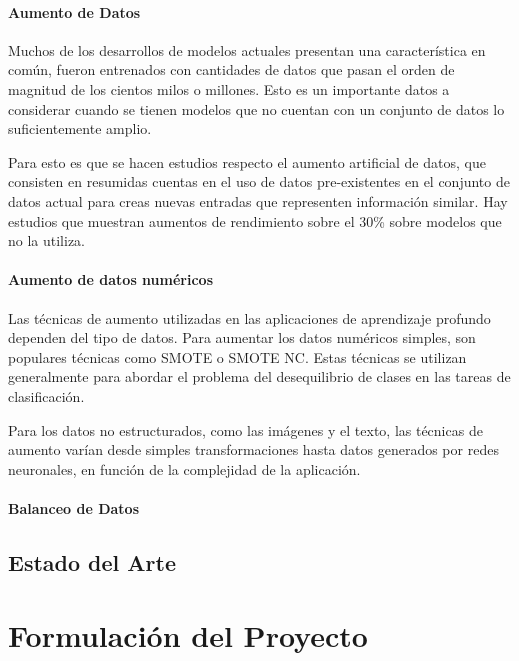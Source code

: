 \documentclass[letter,12pt]{report}
\begin{document}
\subsubsection{Aumento de Datos}
Muchos de los desarrollos de modelos actuales presentan una característica en común,
fueron entrenados con cantidades de datos que pasan el orden de magnitud de los cientos
milos o millones. Esto es un importante datos a considerar cuando se tienen modelos que
no cuentan con un conjunto de datos lo suficientemente amplio.

Para esto es que se hacen estudios respecto el aumento artificial de datos, que consisten
en resumidas cuentas en el uso de datos pre-existentes en el conjunto de datos actual
para creas nuevas entradas que representen información similar. Hay estudios que muestran
aumentos de rendimiento sobre el 30\% sobre modelos que no la utiliza.

\subsubsection{Aumento de datos numéricos}
Las técnicas de aumento utilizadas en las aplicaciones de aprendizaje profundo dependen del tipo de datos. Para aumentar los datos numéricos simples, son populares técnicas como SMOTE o SMOTE NC. Estas técnicas se utilizan generalmente para abordar el problema del desequilibrio de clases en las tareas de clasificación. 

Para los datos no estructurados, como las imágenes y el texto, las técnicas de aumento varían desde simples transformaciones hasta datos generados por redes neuronales, en función de la complejidad de la aplicación.

\subsubsection{Balanceo de Datos}


\section{Estado del Arte}\label{arte}

\chapter{Formulación del Proyecto}\label{formulación}
\end{document}
